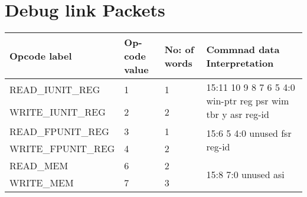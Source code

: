 
\chapter{Debug link Packets}
\label{appDebug} %

\begin{longtable}{m{5.7cm} |m{0.9cm} |m{1cm} |m{6.9cm}}
	
	\hline
	\hline
	\textbf{Opcode label} & \textbf{Op- code value} & \textbf{No: of words} & \textbf{Commnad data Interpretation}\\
	\hline
	\hline
	READ\_IUNIT\_REG  & 1 & 1 & 
	\multirow{2}{*}{ \begin{minipage}{6.9cm}
			15:11 \hspace*{0.4cm} 10 \hspace*{0.35cm} 9 \hspace*{0.4cm} 8 \hspace*{0.2cm} 7 \hspace*{0.25cm} 6 \hspace*{0.25cm} 5 \hspace*{0.22cm} 4:0
			\newline
			win-ptr reg psr wim \hspace*{0.05cm} tbr \hspace*{0.1cm} y \hspace*{0.1cm} asr \hspace*{0.05cm} reg-id
		\end{minipage}}
		\\ \cline{1-3}	
		WRITE\_IUNIT\_REG  & 2 & 2 & \\
		\hline
		
		READ\_FPUNIT\_REG  & 3 & 1 &
		\multirow{2}{*}{ \begin{minipage}{6.9cm}
				15:6 \hspace*{0.55cm} 5 \hspace*{0.4cm} 4:0
				\newline
				unused \hspace*{0.1cm} fsr \hspace*{0.06cm} reg-id
			\end{minipage}}
			\\ \cline{1-3}	
			WRITE\_FPUNIT\_REG  & 4 & 2 &	\\
			\hline
			
			READ\_MEM  & 6 & 2 &
			\multirow{2}{*}{ \begin{minipage}{6.9cm}
					15:8 \hspace*{0.55cm} 7:0
					\newline
					unused \hspace*{0.1cm} asi
				\end{minipage}}
				\\ \cline{1-3}	
				WRITE\_MEM  & 7 & 3 &	\\
				\hline
				

\end{longtable}
